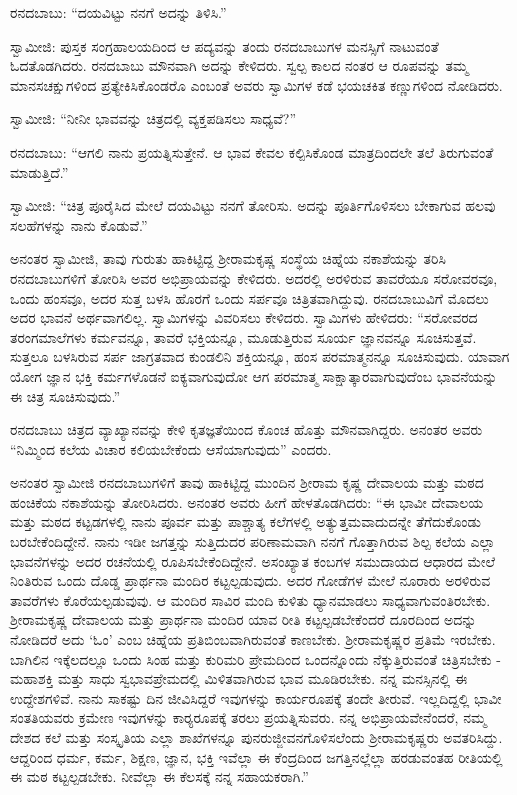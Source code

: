  ರನದಬಾಬು: “ದಯವಿಟ್ಟು ನನಗೆ ಅದನ್ನು ತಿಳಿಸಿ.” 

 ಸ್ವಾಮೀಜಿ: ಪುಸ್ತಕ ಸಂಗ್ರಹಾಲಯದಿಂದ ಆ ಪದ್ಯವನ್ನು ತಂದು ರನದಬಾಬುಗಳ ಮನಸ್ಸಿಗೆ ನಾಟುವಂತೆ ಓದತೊಡಗಿದರು. ರನದಬಾಬು ಮೌನವಾಗಿ ಅದನ್ನು ಕೇಳಿದರು. ಸ್ವಲ್ಪ ಕಾಲದ ನಂತರ ಆ ರೂಪವನ್ನು ತಮ್ಮ ಮಾನಸಚಕ್ಷುಗಳಿಂದ ಪ್ರತ್ಯೇಕಿಸಿಕೊಂಡರೊ ಎಂಬಂತೆ ಅವರು ಸ್ವಾಮಿಗಳ ಕಡೆ ಭಯಚಕಿತ ಕಣ್ಣುಗಳಿಂದ ನೋಡಿದರು. 

 ಸ್ವಾಮೀಜಿ: “ನೀನೀ ಭಾವವನ್ನು ಚಿತ್ರದಲ್ಲಿ ವ್ಯಕ್ತಪಡಿಸಲು ಸಾಧ್ಯವೆ?” 

 ರನದಬಾಬು: “ಆಗಲಿ ನಾನು ಪ್ರಯತ್ನಿಸುತ್ತೇನೆ. ಆ ಭಾವ ಕೇವಲ ಕಲ್ಪಿಸಿಕೊಂಡ ಮಾತ್ರದಿಂದಲೇ ತಲೆ ತಿರುಗುವಂತೆ ಮಾಡುತ್ತಿದೆ.” 

 ಸ್ವಾಮೀಜಿ: “ಚಿತ್ರ ಪೂರೈಸಿದ ಮೇಲೆ ದಯವಿಟ್ಟು ನನಗೆ ತೋರಿಸು. ಅದನ್ನು ಪೂರ್ತಿಗೊಳಿಸಲು ಬೇಕಾಗುವ ಹಲವು ಸಲಹೆಗಳನ್ನು ನಾನು ಕೊಡುವೆ.” 

 ಅನಂತರ ಸ್ವಾಮೀಜಿ, ತಾವು ಗುರುತು ಹಾಕಿಟ್ಟಿದ್ದ ಶ‍್ರೀರಾಮಕೃಷ್ಣ ಸಂಸ್ಥೆಯ ಚಿಹ್ನೆಯ ನಕಾಶೆಯನ್ನು ತರಿಸಿ ರನದಬಾಬುಗಳಿಗೆ ತೋರಿಸಿ ಅವರ ಅಭಿಪ್ರಾಯವನ್ನು ಕೇಳಿದರು. ಅದರಲ್ಲಿ ಅರಳಿರುವ ತಾವರೆಯೂ ಸರೋವರವೂ, ಒಂದು ಹಂಸವೂ, ಅದರ ಸುತ್ತ ಬಳಸಿ ಹೊರಗೆ ಒಂದು ಸರ್ಪವೂ ಚಿತ್ರಿತವಾಗಿದ್ದುವು. ರನದಬಾಬುವಿಗೆ ಮೊದಲು ಅದರ ಭಾವನೆ ಅರ್ಥವಾಗಲಿಲ್ಲ. ಸ್ವಾಮಿಗಳನ್ನು ವಿವರಿಸಲು ಕೇಳಿದರು. ಸ್ವಾಮಿಗಳು ಹೇಳಿದರು: “ಸರೋವರದ ತರಂಗಮಾಲೆಗಳು ಕರ್ಮವನ್ನೂ, ತಾವರೆ ಭಕ್ತಿಯನ್ನೂ, ಮೂಡುತ್ತಿರುವ ಸೂರ್ಯ ಜ್ಞಾನವನ್ನೂ ಸೂಚಿಸುತ್ತವೆ. ಸುತ್ತಲೂ ಬಳಸಿರುವ ಸರ್ಪ ಜಾಗ್ರತವಾದ ಕುಂಡಲಿನಿ ಶಕ್ತಿಯನ್ನೂ, ಹಂಸ ಪರಮಾತ್ಮನನ್ನೂ ಸೂಚಿಸುವುದು. ಯಾವಾಗ ಯೋಗ ಜ್ಞಾನ ಭಕ್ತಿ ಕರ್ಮಗಳೊಡನೆ ಐಕ್ಯವಾಗುವುದೋ ಆಗ ಪರಮಾತ್ಮ ಸಾಕ್ಷಾತ್ಕಾರವಾಗುವುದೆಂಬ ಭಾವನೆಯನ್ನು ಈ ಚಿತ್ರ ಸೂಚಿಸುವುದು.” 

\vskip 1pt

 ರನದಬಾಬು ಚಿತ್ರದ ವ್ಯಾಖ್ಯಾನವನ್ನು ಕೇಳಿ ಕೃತಜ್ಞತೆಯಿಂದ ಕೊಂಚ ಹೊತ್ತು ಮೌನವಾಗಿದ್ದರು. ಅನಂತರ ಅವರು “ನಿಮ್ಮಿಂದ ಕಲೆಯ ವಿಚಾರ ಕಲಿಯಬೇಕೆಂದು ಆಸೆಯಾಗುವುದು” ಎಂದರು. 

\vskip 1pt

 ಅನಂತರ ಸ್ವಾಮೀಜಿ ರನದಬಾಬುಗಳಿಗೆ ತಾವು ಹಾಕಿಟ್ಟಿದ್ದ ಮುಂದಿನ ಶ‍್ರೀರಾಮ ಕೃಷ್ಣ ದೇವಾಲಯ ಮತ್ತು ಮಠದ ಹಂಚಿಕೆಯ ನಕಾಶೆಯನ್ನು ತೋರಿಸಿದರು. ಅನಂತರ ಅವರು ಹೀಗೆ ಹೇಳತೊಡಗಿದರು: “ಈ ಭಾವೀ ದೇವಾಲಯ ಮತ್ತು ಮಠದ ಕಟ್ಟಡಗಳಲ್ಲಿ ನಾನು ಪೂರ್ವ ಮತ್ತು ಪಾಶ್ಚಾತ್ಯ ಕಲೆಗಳಲ್ಲಿ ಅತ್ಯುತ್ತಮವಾದುದನ್ನೇ ತೆಗೆದುಕೊಂಡು ಬರಬೇಕೆಂದಿದ್ದೇನೆ. ನಾನು ಇಡೀ ಜಗತ್ತನ್ನು ಸುತ್ತಿದುದರ ಪರಿಣಾಮವಾಗಿ ನನಗೆ ಗೊತ್ತಾಗಿರುವ ಶಿಲ್ಪ ಕಲೆಯ ಎಲ್ಲಾ ಭಾವನೆಗಳನ್ನು ಅದರ ರಚನೆಯಲ್ಲಿ ರೂಪಿಸಬೇಕೆಂದಿದ್ದೇನೆ. ಅಸಂಖ್ಯಾತ ಕಂಬಗಳ ಸಮುದಾಯದ ಆಧಾರದ ಮೇಲೆ ನಿಂತಿರುವ ಒಂದು ದೊಡ್ಡ ಪ್ರಾರ್ಥನಾ ಮಂದಿರ ಕಟ್ಟಲ್ಪಡುವುದು. ಅದರ ಗೋಡೆಗಳ ಮೇಲೆ ನೂರಾರು ಅರಳಿರುವ ತಾವರೆಗಳು ಕೊರೆಯಲ್ಪಡುವುವು. ಆ ಮಂದಿರ ಸಾವಿರ ಮಂದಿ ಕುಳಿತು ಧ್ಯಾನಮಾಡಲು ಸಾಧ್ಯವಾಗುವಂತಿರಬೇಕು. ಶ‍್ರೀರಾಮಕೃಷ್ಣ ದೇವಾಲಯ ಮತ್ತು ಪ್ರಾರ್ಥನಾ ಮಂದಿರ ಯಾವ ರೀತಿ ಕಟ್ಟಲ್ಪಡಬೇಕೆಂದರೆ ದೂರದಿಂದ ಅದನ್ನು ನೋಡಿದರೆ ಅದು ‘ಓಂ’ ಎಂಬ ಚಿಹ್ನೆಯ ಪ್ರತಿಬಿಂಬವಾಗಿರುವಂತೆ ಕಾಣಬೇಕು. ಶ‍್ರೀರಾಮಕೃಷ್ಣರ ಪ್ರತಿಮೆ ಇರಬೇಕು. ಬಾಗಿಲಿನ ಇಕ್ಕೆಲದಲ್ಲೂ ಒಂದು ಸಿಂಹ ಮತ್ತು ಕುರಿಮರಿ ಪ್ರೇಮದಿಂದ ಒಂದನ್ನೊಂದು ನೆಕ್ಕುತ್ತಿರುವಂತೆ ಚಿತ್ರಿಸಬೇಕು - ಮಹಾಶಕ್ತಿ ಮತ್ತು ಸಾಧು ಸ್ವಭಾವ\break ಪ್ರೇಮದಲ್ಲಿ ಮಿಳಿತವಾಗಿರುವ ಭಾವ ಮೂಡಿರಬೇಕು. ನನ್ನ ಮನಸ್ಸಿನಲ್ಲಿ ಈ ಉದ್ದೇಶಗಳಿವೆ. ನಾನು ಸಾಕಷ್ಟು ದಿನ ಜೀವಿಸಿದ್ದರೆ ಇವುಗಳನ್ನು ಕಾರ್ಯರೂಪಕ್ಕೆ ತಂದೇ ತೀರುವೆ. ಇಲ್ಲದಿದ್ದಲ್ಲಿ ಭಾವೀ ಸಂತತಿಯವರು ಕ್ರಮೇಣ ಇವುಗಳನ್ನು ಕಾರ‍್ಯರೂಪಕ್ಕೆ ತರಲು ಪ್ರಯತ್ನಿಸುವರು. ನನ್ನ ಅಭಿಪ್ರಾಯವೇನೆಂದರೆ, ನಮ್ಮ ದೇಶದ ಕಲೆ ಮತ್ತು ಸಂಸ್ಕೃತಿಯ ಎಲ್ಲಾ ಶಾಖೆಗಳನ್ನೂ ಪುನರುಜ್ಜೀವನಗೊಳಿಸಲೆಂದು ಶ‍್ರೀರಾಮಕೃಷ್ಣರು ಅವತರಿಸಿದ್ದು. ಆದ್ದರಿಂದ ಧರ್ಮ, ಕರ್ಮ, ಶಿಕ್ಷಣ, ಜ್ಞಾನ, ಭಕ್ತಿ ಇವೆಲ್ಲಾ ಈ ಕೆಂದ್ರದಿಂದ ಜಗತ್ತಿನಲ್ಲೆಲ್ಲಾ ಹರಡುವಂತಹ ರೀತಿಯಲ್ಲಿ ಈ ಮಠ ಕಟ್ಟಲ್ಪಡಬೇಕು. ನೀವೆಲ್ಲಾ ಈ ಕೆಲಸಕ್ಕೆ ನನ್ನ ಸಹಾಯಕರಾಗಿ.” 

